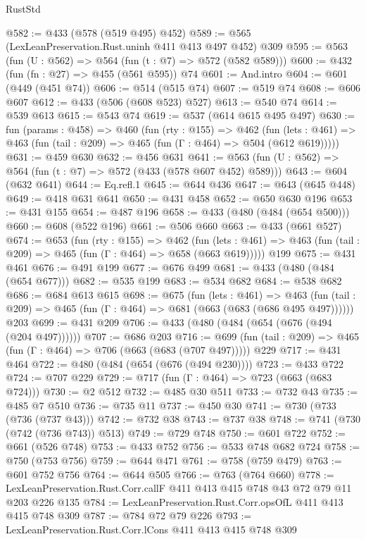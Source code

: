 \begin{lexlean}{RustStd}
\begin{coremodule}
{\begin{coremodule}
{{{{{{@582 := @433 (@578 (@519 @495) @452)
@589 := @565 (LexLeanPreservation.Rust.uninh @411 @413 @497 @452) @309
@595 := @563 (fun (U : @562) => @564 (fun (t : @7) => @572 (@582 @589)))
@600 := @432 (fun (fn : @27) => @455 (@561 @595)) @74
@601 := And.intro
@604 := @601 (@449 (@451 @74))
@606 := @514 (@515 @74)
@607 := @519 @74
@608 := @606 @607
@612 := @433 (@506 (@608 @523) @527)
@613 := @540 @74
@614 := @539 @613
@615 := @543 @74
@619 := @537 (@614 @615 @495 @497)
@630 := fun (params : @458) =>
  @460
    (fun (rty : @155) =>
    @462
      (fun (lets : @461) => @463 (fun (tail : @209) => @465 (fun (Γ : @464) => @504 (@612 @619)))))
@631 := @459 @630
@632 := @456 @631
@641 := @563 (fun (U : @562) => @564 (fun (t : @7) => @572 (@433 (@578 @607 @452) @589)))
@643 := @604 (@632 @641)
@644 := Eq.refl.{1}
@645 := @644 @436
@647 := @643 (@645 @448)
@649 := @418 @631 @641
@650 := @431 @458
@652 := @650 @630 @196
@653 := @431 @155
@654 := @487 @196
@658 := @433 (@480 (@484 (@654 @500)))
@660 := @608 (@522 @196)
@661 := @506 @660
@663 := @433 (@661 @527)
@674 := @653
    (fun (rty : @155) =>
    @462
      (fun (lets : @461) => @463 (fun (tail : @209) => @465 (fun (Γ : @464) => @658 (@663 @619)))))
    @199
@675 := @431 @461
@676 := @491 @199
@677 := @676 @499
@681 := @433 (@480 (@484 (@654 @677)))
@682 := @535 @199
@683 := @534 @682
@684 := @538 @682
@686 := @684 @613 @615
@698 := @675
    (fun (lets : @461) =>
    @463 (fun (tail : @209) => @465 (fun (Γ : @464) => @681 (@663 (@683 (@686 @495 @497))))))
    @203
@699 := @431 @209
@706 := @433 (@480 (@484 (@654 (@676 (@494 (@204 @497))))))
@707 := @686 @203
@716 := @699 (fun (tail : @209) => @465 (fun (Γ : @464) => @706 (@663 (@683 (@707 @497))))) @229
@717 := @431 @464
@722 := @480 (@484 (@654 (@676 (@494 @230))))
@723 := @433 @722
@724 := @707 @229
@729 := @717 (fun (Γ : @464) => @723 (@663 (@683 @724)))
@730 := @2 @512
@732 := @485 @30 @511
@733 := @732 @43
@735 := @485 @7 @510
@736 := @735 @11
@737 := @450 @30
@741 := @730 (@733 (@736 (@737 @43)))
@742 := @732 @38
@743 := @737 @38
@748 := @741 (@730 (@742 (@736 @743)) @513)
@749 := @729 @748
@750 := @601 @722
@752 := @661 (@526 @748)
@753 := @433 @752
@756 := @533 @748 @682 @724
@758 := @750 (@753 @756)
@759 := @644 @471
@761 := @758 (@759 @479)
@763 := @601 @752 @756
@764 := @644 @505
@766 := @763 (@764 @660)
@778 := LexLeanPreservation.Rust.Corr.callF @411 @413 @415 @748 @43 @72 @79 @11 @203 @226 @135
@784 := LexLeanPreservation.Rust.Corr.opsOfL @411 @413 @415 @748 @309
@787 := @784 @72 @79 @226
@793 := LexLeanPreservation.Rust.Corr.lCons @411 @413 @415 @748 @309
}}}}}}
\end{coremodule}}
\end{coremodule}
\end{lexlean}
